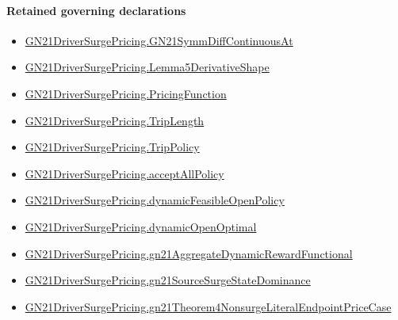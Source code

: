 \documentclass[10pt]{article}
\begin{document}
\paragraph{Retained governing declarations}
\begin{itemize}\raggedright
\item \hyperlink{governing-declaration-1cbfd461a5d57e7c}{GN21\allowbreak{}Driver\allowbreak{}Surge\allowbreak{}Pricing.\allowbreak{}GN21\allowbreak{}Symm\allowbreak{}Diff\allowbreak{}Continuous\allowbreak{}At}
\item \hyperlink{paper-prerequisite-bdf8218f91905191}{GN21\allowbreak{}Driver\allowbreak{}Surge\allowbreak{}Pricing.\allowbreak{}Lemma5\allowbreak{}Derivative\allowbreak{}Shape}
\item \hyperlink{governing-declaration-9ab0ab344da5df05}{GN21\allowbreak{}Driver\allowbreak{}Surge\allowbreak{}Pricing.\allowbreak{}Pricing\allowbreak{}Function}
\item \hyperlink{governing-declaration-a616c143f22cf2bc}{GN21\allowbreak{}Driver\allowbreak{}Surge\allowbreak{}Pricing.\allowbreak{}Trip\allowbreak{}Length}
\item \hyperlink{governing-declaration-4312ad4cb899871f}{GN21\allowbreak{}Driver\allowbreak{}Surge\allowbreak{}Pricing.\allowbreak{}Trip\allowbreak{}Policy}
\item \hyperlink{governing-declaration-e94c9281d4f4b12d}{GN21\allowbreak{}Driver\allowbreak{}Surge\allowbreak{}Pricing.\allowbreak{}accept\allowbreak{}All\allowbreak{}Policy}
\item \hyperlink{governing-declaration-872ce4c6cb27cc60}{GN21\allowbreak{}Driver\allowbreak{}Surge\allowbreak{}Pricing.\allowbreak{}dynamic\allowbreak{}Feasible\allowbreak{}Open\allowbreak{}Policy}
\item \hyperlink{governing-declaration-abf3520e319b0ec7}{GN21\allowbreak{}Driver\allowbreak{}Surge\allowbreak{}Pricing.\allowbreak{}dynamic\allowbreak{}Open\allowbreak{}Optimal}
\item \hyperlink{governing-declaration-b6de248b59bff61c}{GN21\allowbreak{}Driver\allowbreak{}Surge\allowbreak{}Pricing.\allowbreak{}gn21\allowbreak{}Aggregate\allowbreak{}Dynamic\allowbreak{}Reward\allowbreak{}Functional}
\item \hyperlink{governing-declaration-3496ffa016b3bb1e}{GN21\allowbreak{}Driver\allowbreak{}Surge\allowbreak{}Pricing.\allowbreak{}gn21\allowbreak{}Source\allowbreak{}Surge\allowbreak{}State\allowbreak{}Dominance}
\item \hyperlink{governing-declaration-a3042b05d8bcaf91}{GN21\allowbreak{}Driver\allowbreak{}Surge\allowbreak{}Pricing.\allowbreak{}gn21\allowbreak{}Theorem4\allowbreak{}Nonsurge\allowbreak{}Literal\allowbreak{}Endpoint\allowbreak{}Price\allowbreak{}Case}

\end{itemize}
\end{document}
